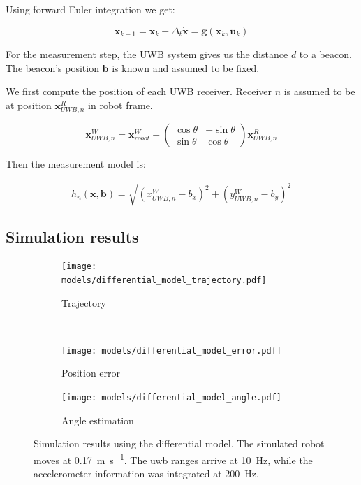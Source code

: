 \documentclass[a4paper, 12pt]{scrreprt}
\begin{document}
Using forward Euler integration we get:

\begin{equation}
\mathbf{x}_{k+1} = \mathbf{x}_{k} + \Delta_t \mathbf{\dot{x}} = \mathbf{g}\left(\mathbf{x}_{k}, \mathbf{u}_k\right)
\end{equation}

For the measurement step, the UWB system gives us the distance $d$ to a beacon.
The beacon's position $\mathbf{b}$ is known and assumed to be fixed.

We first compute the position of each UWB receiver. Receiver $n$ is assumed to be at position $\mathbf{x}_{UWB,n}^R$ in robot frame.

\begin{equation}
\mathbf{x}_{UWB,n}^W = \mathbf{x}_{robot}^W + \begin{pmatrix}
\cos \theta & - \sin \theta \\
\sin \theta & \cos \theta
\end{pmatrix} \mathbf{x}_{UWB,n}^R
\end{equation}

Then the measurement model is:

\begin{equation}
h_n(\mathbf{x}, \mathbf{b}) = \sqrt{(x_{UWB,n}^W - b_x)^2 + (y_{UWB,n}^W - b_y)^2}
\end{equation}

\subsection{Simulation results}

\begin{figure}[h!]
    \centering
    \begin{subfigure}[t]{0.4\textwidth}
        \texttt{[image: models/differential\_model\_trajectory.pdf]}
        \caption{Trajectory}
    \end{subfigure}%
    ~
    \begin{subfigure}[t]{0.4\textwidth}
        \texttt{[image: models/differential\_model\_error.pdf]}
        \caption{Position error}
    \end{subfigure}

    \begin{subfigure}[t]{0.4\textwidth}
        \texttt{[image: models/differential\_model\_angle.pdf]}
        \caption{Angle estimation}
    \end{subfigure}

    \caption{Simulation results using the differential model.
        The simulated robot moves at \SI{0.17}{\meter\per\second}.
        The \gls{uwb} ranges arrive at \SI{10}{\hertz}, while the accelerometer information was integrated at \SI{200}{\hertz}.
        \label{fig:differential_model}
    }
\end{figure}
\end{document}
